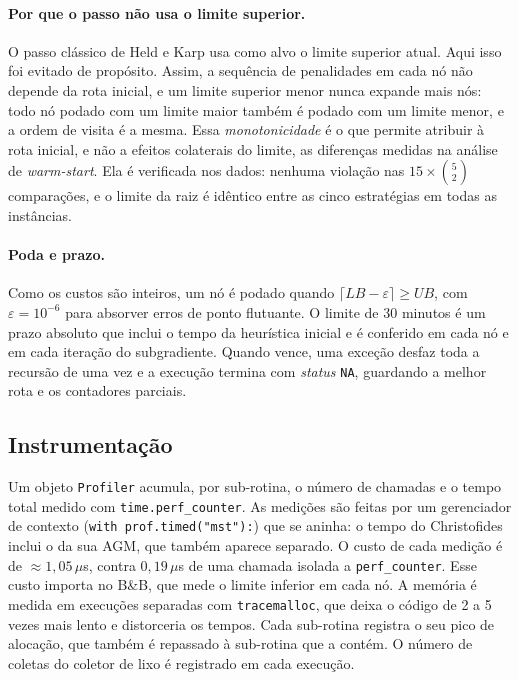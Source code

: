 \paragraph{Por que o passo não usa o limite superior.} O passo clássico de Held e Karp
usa como alvo o limite superior atual. Aqui isso foi evitado de propósito. Assim, a
sequência de penalidades em cada nó não depende da rota inicial, e um limite superior
menor nunca expande mais nós: todo nó podado com um limite maior também é podado com um
limite menor, e a ordem de visita é a mesma. Essa \emph{monotonicidade} é o que permite
atribuir à rota inicial, e não a efeitos colaterais do limite, as diferenças medidas na
análise de \emph{warm-start}. Ela é verificada nos dados: nenhuma violação nas
$15 \times \binom{5}{2}$ comparações, e o limite da raiz é idêntico entre as cinco
estratégias em todas as instâncias.

\paragraph{Poda e prazo.} Como os custos são inteiros, um nó é podado quando
$\lceil LB - \varepsilon \rceil \geq UB$, com $\varepsilon = 10^{-6}$ para absorver
erros de ponto flutuante. O limite de 30 minutos é um prazo absoluto que inclui o tempo
da heurística inicial e é conferido em cada nó e em cada iteração do subgradiente.
Quando vence, uma exceção desfaz toda a recursão de uma vez e a execução termina com
\emph{status} \texttt{NA}, guardando a melhor rota e os contadores parciais.

\subsection{Instrumentação}

Um objeto \texttt{Profiler} acumula, por sub-rotina, o número de chamadas e o tempo total
medido com \texttt{time.perf\_counter}. As medições são feitas por um gerenciador de
contexto (\texttt{with prof.timed("mst"):}) que se aninha: o tempo do Christofides inclui
o da sua AGM, que também aparece separado. O custo de cada medição é de
$\approx 1{,}05\,\mu$s, contra $0{,}19\,\mu$s de uma chamada isolada a
\texttt{perf\_counter}. Esse custo importa no B\&B, que mede o limite inferior em cada
nó. A memória é medida em execuções separadas com \texttt{tracemalloc}, que deixa o
código de 2 a 5 vezes mais lento e distorceria os tempos. Cada sub-rotina registra o seu
pico de alocação, que também é repassado à sub-rotina que a contém. O número de coletas
do coletor de lixo é registrado em cada execução.

